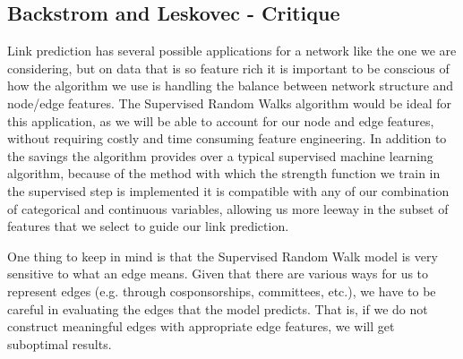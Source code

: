 \subsection{Backstrom and Leskovec - Critique}

Link prediction has several possible applications for a network like the one 
we are considering, but on data that is so feature rich it is important to be 
conscious of how the algorithm we use is handling the balance between network 
structure and node/edge features.  The Supervised Random Walks algorithm would
be ideal for this application, as we will be able to account for our node and 
edge features, without requiring costly and time consuming feature engineering. 
In addition to the savings the algorithm provides over a typical supervised
machine learning algorithm, because of the method with which the strength 
function we train in the supervised step is implemented it is compatible with 
any of our combination of categorical and continuous variables, allowing us more
leeway in the subset of features that we select to guide our link prediction.

One thing to keep in mind is that the Supervised Random Walk model is very
sensitive to what an edge means. Given that there are various ways for us to
represent edges (e.g. through cosponsorships, committees, etc.), we have to be
careful in evaluating the edges that the model predicts. That is, if we do not
construct meaningful edges with appropriate edge features, we will get
suboptimal results.

